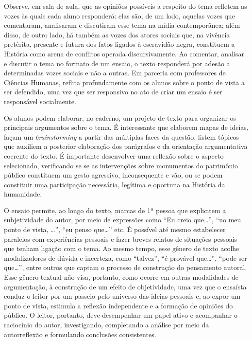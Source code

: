 \documentclass[11pt]{extarticle}
\begin{document}
Observe, em sala de aula, que as opiniões possíveis a respeito do tema
refletem as vozes às quais cada aluno responderá: elas são, de um lado,
aquelas vozes que comentaram, analisaram e discutiram esse tema na mídia
contemporânea; além disso, de outro lado, há também as vozes dos atores
sociais que, na vivência pretérita, presente e futura dos fatos ligados
à escravidão negra, constituem a História como arena de conflitos
operada discursivamente. Ao comentar, analisar e discutir o tema no
formato de um ensaio, o texto responderá por adesão a determinadas vozes
sociais e não a outras. Em parceria com professores de Ciências Humanas,
reflita profundamente com os alunos sobre o ponto de vista a ser
defendido, uma vez que ser responsivo no ato de criar um ensaio é ser
responsável socialmente.

Os alunos podem elaborar, no caderno, um projeto de texto para organizar
os principais argumentos sobre o tema. É interessante que elaborem mapas
de ideias, façam um \emph{brainstorming} a partir das múltiplas faces da
questão, listem tópicos que auxiliem a posterior elaboração dos
parágrafos e da orientação argumentativa coerente do texto. É importante
desenvolver uma reflexão sobre o aspecto selecionado, verificando se se
as intervenções sobre monumentos do patrimônio público constituem um
gesto agressivo, inconsequente e vão, ou se podem constituir uma
participação necessária, legítima e oportuna na História da humanidade.

O ensaio permite, ao longo do texto, marcas de 1ª pessoa que explicitem
a subjetividade do autor, por meio de expressões como ``Eu creio
que\ldots{}'', ``no meu ponto de vista, \ldots{}'', ``eu penso que\ldots{}'' etc. É
possível até mesmo estabelecer paralelos com experiências pessoais e
fazer breves relatos de situações pessoais que tenham ligação com o
tema. Ao mesmo tempo, esse gênero de texto acolhe modalizadores de
dúvida e incerteza, como ``talvez'', ``é provável que\ldots{}'', ``pode ser
que\ldots{}'', entre outros que captam o processo de construção do pensamento
autoral. Esse gênero textual não visa, portanto, como ocorre em outras
modalidades de argumentação, à construção de um efeito de objetividade,
uma vez que o ensaísta conduz o leitor por um passeio pelo universo das
ideias pessoais e, ao expor um ponto de vista, estimula a reflexão
independente e a formação de opiniões do público. O leitor, portanto,
deve desempenhar um papel ativo e acompanhar o raciocínio do autor,
investigando, completando a análise por meio da autorreflexão e
formulando conclusões consistentes.
\end{document}
